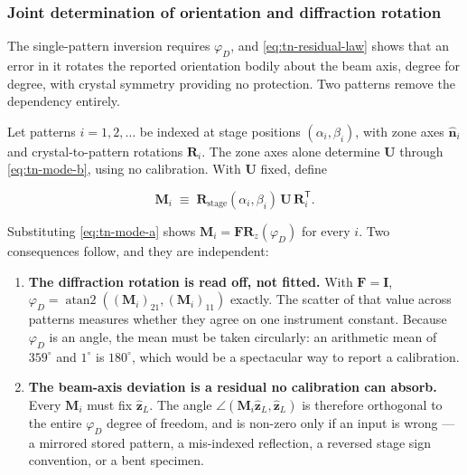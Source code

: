 \subsubsection{Joint determination of orientation and diffraction rotation}

The single-pattern inversion requires $\varphi_D$, and \eqref{eq:tn-residual-law} shows that an
error in it rotates the reported orientation bodily about the beam axis, degree for degree, with
crystal symmetry providing no protection. Two patterns remove the dependency entirely.

Let patterns $i = 1, 2, \ldots$ be indexed at stage positions $(\alpha_i, \beta_i)$, with zone axes
$\hat{\mathbf{n}}_i$ and crystal-to-pattern rotations $\mathbf{R}_i$. The zone axes alone determine
$\mathbf{U}$ through \eqref{eq:tn-mode-b}, using no calibration. With $\mathbf{U}$ fixed, define

\begin{equation}
\mathbf{M}_i \;\equiv\; \mathbf{R}_{\text{stage}}(\alpha_i,\beta_i)\,\mathbf{U}\,\mathbf{R}_i^{\mathsf T}.
\label{eq:tn-residual}
\end{equation}

Substituting \eqref{eq:tn-mode-a} shows $\mathbf{M}_i = \mathbf{F}\mathbf{R}_z(\varphi_D)$ for every
$i$. Two consequences follow, and they are independent:

\begin{enumerate}
  \item \textbf{The diffraction rotation is read off, not fitted.} With $\mathbf{F} = \mathbf{I}$,
    $\varphi_D = \operatorname{atan2}\left((\mathbf{M}_i)_{21}, (\mathbf{M}_i)_{11}\right)$ exactly.
    The scatter of that value across patterns measures whether they agree on one instrument
    constant. Because $\varphi_D$ is an angle, the mean must be taken circularly: an arithmetic mean
    of $359^{\circ}$ and $1^{\circ}$ is $180^{\circ}$, which would be a spectacular way to report a
    calibration.
  \item \textbf{The beam-axis deviation is a residual no calibration can absorb.} Every
    $\mathbf{M}_i$ must fix $\hat{\mathbf{z}}_L$. The angle
    $\angle(\mathbf{M}_i\hat{\mathbf{z}}_L, \hat{\mathbf{z}}_L)$ is therefore orthogonal to the
    entire $\varphi_D$ degree of freedom, and is non-zero only if an input is wrong --- a mirrored
    stored pattern, a mis-indexed reflection, a reversed stage sign convention, or a bent specimen.
\end{enumerate}

